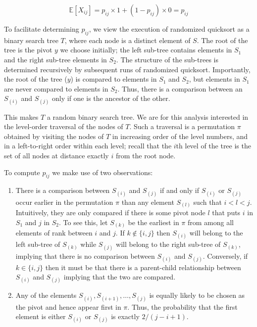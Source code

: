 \[
	\mathbb{E}[X_{ij}] = p_{ij} \times 1 + (1 - p_{ij}) \times 0 = p_{ij}
\]

To facilitate determining $p_{ij}$, we view the execution of randomized quicksort as a binary search tree $T$, where
each node is a distinct element of $S$. The root of the tree is the pivot $y$ we choose initially; the left sub-tree
contains elements in $S_1$ and the right sub-tree elements in $S_2$. The structure of the sub-trees is determined
recursively by subsequent runs of randomized quicksort. Importantly, the root of the tree ($y$) is compared to elements
in $S_1$ and $S_2$, but elements in $S_1$ are never compared to elements in $S_2$. Thus, there is a comparison between
an $S_{(i)}$ and $S_{(j)}$ only if one is the ancestor of the other.

This makes $T$ a random binary search tree. We are for this analysis interested in the level-order traversal of the
nodes of $T$. Such a traversal is a permutation $\pi$ obtained by visiting the nodes of $T$ in increasing order of
the level numbers, and in a left-to-right order within each level; recall that the $i$th level of the tree is the set
of all nodes at distance exactly $i$ from the root node.

To compute $p_{ij}$ we make use of two observations:

\begin{enumerate}
	\item There is a comparison between $S_{(i)}$ and $S_{(j)}$ if and only if $S_{(i)}$ or $S_{(j)}$ occur
	earlier in the permutation $\pi$ than any element $S_{(l)}$ such that $i < l < j$. Intuitively, they are
	only compared if there is some pivot node $l$ that puts $i$ in $S_1$ and $j$ in $S_2$. To see this, let
	$S_{(k)}$ be the earliest in $\pi$ from among all elements of rank between $i$ and $j$. If $k \notin \{i,j\}$
	then $S_{(i)}$ will belong to the left sub-tree of $S_{(k)}$ while $S_{(j)}$ will belong to the right sub-tree
	of $S_{(k)}$, implying that there is no comparison between $S_{(i)}$ and $S_{(j)}$. Conversely, if
	$k \in \{i,j\}$ then it must be that there is a parent-child relationship between $S_{(i)}$ and $S_{(j)}$
	implying that the two are compared.

	\item Any of the elements $S_{(i)}, S_{(i+1)}, \hdots, S_{(j)}$ is equally likely to be chosen as the pivot and
	hence appear first in $\pi$. Thus, the probability that the first element is either $S_{(i)}$ or $S_{(j)}$ is
	exactly $2 / (j - i + 1)$.
\end{enumerate}

